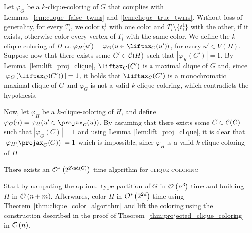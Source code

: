 \begin{tproof}
    Let $\varphi_G$ be a $k$-clique-coloring of $G$ that complies with Lemmas~\ref{lem:clique_false_twins} and~\ref{lem:clique_true_twins}.
    Without loss of generality, for every $T_i$, we color $t_i^1$ with one color and $T_i \setminus \{t_i^1\}$ with the other, if it exists, otherwise color every vertex of $T_i$ with the same color.
    We define the $k$-clique-coloring of $H$ as $\varphi_H(u') = \varphi_G(u \in \Lift{C}(u'))$, for every $u' \in V(H)$.
    Suppose now that there exists some $C' \in \mathcal{C}(H)$ such that $|\varphi_H(C')| = 1$.
    By Lemma~\ref{lem:lift_proj_clique}, $\Lift{C}(C')$ is a maximal clique of $G$ and, since $|\varphi_G\left(\Lift{C}(C')\right)| = 1$, it holds that $\Lift{C}(C')$ is a monochromatic maximal clique of $G$ and $\varphi_G$ is not a valid $k$-clique-coloring, which contradicts the hypothesis.
        
    Now, let $\varphi_H$ be a $k$-clique-coloring of $H$, and define $\varphi_G(u) = \varphi_H(u' \in \Proj{C}(u))$.
    By assuming that there exists some $C \in \mathcal{C}(G)$ such that $\left|\varphi_G(C)\right| = 1$ and using Lemma~\ref{lem:lift_proj_clique}, it is clear that $\left|\varphi_H(\Proj{C}(C))\right| = 1$ which is impossible, since $\varphi_H$ is a valid $k$-clique-coloring of $H$.
\end{tproof}

\begin{theorem}
    \label{thm:fpt_clique}
    There exists an $\bigOs{2^{2\nd(G)}}$ time algorithm for \textsc{clique coloring}
\end{theorem}

\begin{tproof}
    Start by computing the optimal type partition of $G$ in $\mathcal{O}\left(n^3\right)$ time and building $H$ in $\mathcal{O}\left(n + m\right)$.
    Afterwards, color $H$ in $\mathcal{O}^*\left(2^{2d}\right)$ time using Theorem~\ref{thm:clique_color_algorithm} and lift the coloring using the construction described in the proof of Theorem~\ref{thm:projected_clique_coloring} in $\mathcal{O}\left(n\right)$.
\end{tproof}
